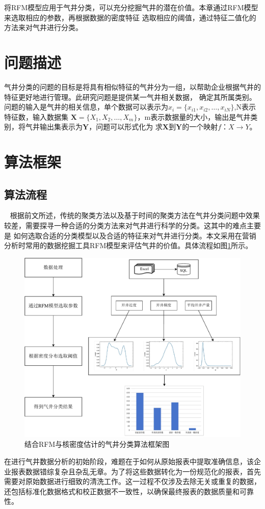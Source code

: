 将RFM模型应用于气井分类，可以充分挖掘气井的潜在价值。本章通过RFM模型来选取相应的参数，再根据数据的密度特征
选取相应的阈值，通过特征二值化的方法来对气井进行分类。
\section{问题描述}
气井分类的问题的目标是将具有相似特征的气井分为一组，以帮助企业根据气井的特征更好地进行管理。此研究问题是提供某一气井相关数据，
确定其所属类别。问题的输入是气井的相关信息，单个数据可以表示为$x_i = \{x_{i1}, x_{i2}, \ldots, x_{iN}\}$,N表示特征数，输入数据集
$\mathbf{X} = \{X_{1}, X_{2}, \ldots, X_{m}\}$，m表示数据量的大小，输出是气井类别，将气井输出集表示为$\mathbf{Y}$，问题可以形式化为
求$\mathbf{X}$到$\mathbf{Y}$的一个映射$f$：$X \rightarrow Y$。
\section{算法框架}
\subsection{算法流程}\
\label{sec:K-Shapeprocess}
根据前文所述，传统的聚类方法以及基于时间的聚类方法在气井分类问题中效果较差，需要探寻一种合适的分类方法来对气井进行科学的分类。这其中的难点主要是
如何选取合适的分类模型以及合适的特征来对气井进行分类。本文采用在营销分析时常用的数据挖掘工具RFM模型来评估气井的价值。具体流程如图\ref{fig:wellcla}所示。
\begin{figure}
    \centering
    \includegraphics[width=.8\linewidth]{figure/气井分类框架图.vision.pdf}
    \caption{结合RFM与核密度估计的气井分类算法框架图}
    \label{fig:wellcla}
\end{figure}
在进行气井数据分析的初始阶段，难题在于如何从原始报表中提取准确信息，该企业报表数据错综复杂且杂乱无章。为了将这些数据转化为一份规范化的报表，首先需要对原始数据进行细致的清洗工作。这一过程不仅涉及去除无关或重复的数据，还包括标准化数据格式和校正数据不一致性，以确保最终报表的数据质量和可靠性。

